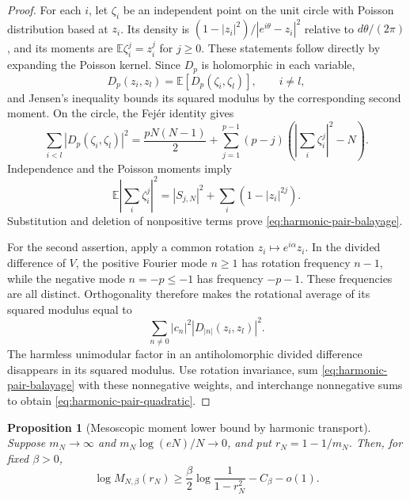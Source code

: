 \documentclass[11pt,a4paper]{article}
\numberwithin{equation}{section}
\newtheorem{proposition}[theorem]{Proposition}
\theoremstyle{definition}
\theoremstyle{remark}
\begin{document}
\begin{proof}
For each $i$, let $\zeta_i$ be an independent point on the unit circle
with Poisson distribution based at $z_i$. Its density is
$(1-|z_i|^2)/|e^{i\theta}-z_i|^2$ relative to $d\theta/(2\pi)$,
and its moments are $\mathbb E\zeta_i^j=z_i^j$ for $j\geq0$.
These statements follow directly by expanding the Poisson kernel.
Since $D_p$ is holomorphic in each variable,
\[
 D_p(z_i,z_l)=\mathbb E[D_p(\zeta_i,\zeta_l)],\qquad i\ne l,
\]
and Jensen's inequality bounds its squared modulus by the corresponding
second moment. On the circle, the Fej\'er identity gives
\[
 \sum_{i<l}|D_p(\zeta_i,\zeta_l)|^2
 =\frac{pN(N-1)}2+
   \sum_{j=1}^{p-1}(p-j)\left(\left|\sum_i\zeta_i^j\right|^2-N\right).
\]
Independence and the Poisson moments imply
\[
 \mathbb E\left|\sum_i\zeta_i^j\right|^2
 =|S_{j,N}|^2+\sum_i(1-|z_i|^{2j}).
\]
Substitution and deletion of nonpositive terms prove
\eqref{eq:harmonic-pair-balayage}.

For the second assertion, apply a common rotation $z_i\mapsto e^{i\alpha}z_i$.
In the divided difference of $V$, the positive Fourier mode $n\geq1$
has rotation frequency $n-1$, while the negative mode $n=-p\leq-1$
has frequency $-p-1$. These frequencies are all distinct. Orthogonality
therefore makes the rotational average of its squared modulus equal to
\[
 \sum_{n\ne0}|c_n|^2|D_{|n|}(z_i,z_l)|^2.
\]
The harmless unimodular factor in an antiholomorphic divided difference
disappears in its squared modulus. Use rotation invariance, sum
\eqref{eq:harmonic-pair-balayage} with these nonnegative weights, and
interchange nonnegative sums to obtain \eqref{eq:harmonic-pair-quadratic}.
\end{proof}

\begin{proposition}[Mesoscopic moment lower bound by harmonic transport]
\label{prop:harmonic-mesoscopic-moment}
Suppose $m_N\to\infty$ and $m_N\log(eN)/N\to0$, and put
$r_N=1-1/m_N$. Then, for fixed $\beta>0$,
\begin{equation}
 \log M_{N,\beta}(r_N)
 \geq\frac\beta2\log\frac1{1-r_N^2}-C_\beta-o(1).
 \label{eq:harmonic-mesoscopic-moment}
\end{equation}
\end{proposition}
\end{document}
